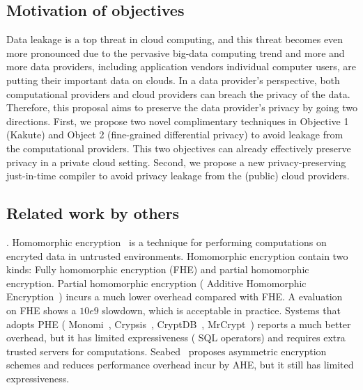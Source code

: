\vspace{-.15in}\subsection{Motivation of objectives} 
\label{sec:motivation}\vspace{-.075in}

Data leakage is a top threat in cloud computing, and this threat becomes even 
more pronounced due to the pervasive big-data computing trend and more and more 
data providers, including application vendors individual computer users, are 
putting their important data on clouds. In a data provider's perspective, both 
computational providers and cloud providers can breach the privacy of the data. 
Therefore, this proposal aims to preserve the data provider's privacy by going 
two directions. First, we propose two novel complimentary techniques in 
Objective 1 (Kakute) and Object 2 (fine-grained differential privacy) to avoid 
leakage from the computational providers. This two objectives can already 
effectively preserve privacy in a private cloud setting. Second, we propose a 
new privacy-preserving just-in-time compiler to avoid privacy leakage from the 
(public) cloud providers.


\subsection{Related work by others} 
\label{sec:others-work}\vspace{-.075in}

. Homomorphic 
encryption~\cite{fullmomo:stoc09,paillier,elgamal} is a
technique for performing computations on encryted data in untrusted 
environments. Homomorphic encryption contain two kinds: Fully 
homomorphic encryption (FHE) and partial 
homomorphic encryption.
Partial homomorphic encryption (\eg{} Additive Homomorphic 
Encryption~\cite{paillier})
incurs a much lower overhead compared with FHE. A evaluation~\cite{homo:eval} on
FHE shows a $10e9$ slowdown, which is acceptable in practice.
Systems that adopts PHE (\eg{} Monomi~\cite{monomi:vldb13},
Crypsis~\cite{crypsis:hotcloud14}, CryptDB~\cite{cryptdb:sosp11},
MrCrypt~\cite{mrcrypt:oospsla14})
reports a much better overhead, but it has limited expressiveness
(\eg{} SQL operators) and requires extra trusted servers for computations.
Seabed~\cite{seabed:osdi16} proposes asymmetric encryption schemes and reduces 
performance overhead
incur by AHE, but it still has limited expressiveness.

